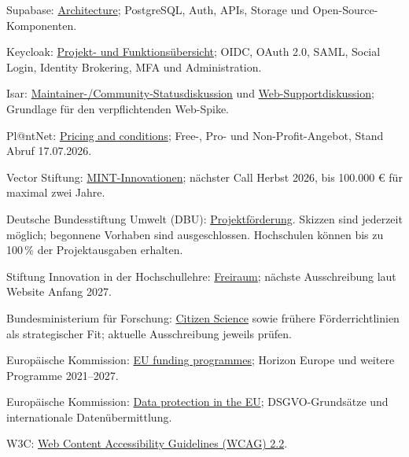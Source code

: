 \documentclass[10pt,a4paper,oneside]{article}
\begin{document}
\begin{enumerate}[leftmargin=9mm,label={\textcolor{Forest}{[\arabic*]}}]
  \hypertarget{src:8}{}\item Supabase: \href{https://supabase.com/docs/guides/getting-started/architecture}{Architecture}; PostgreSQL, Auth, APIs, Storage und Open-Source-Komponenten.
  \hypertarget{src:9}{}\item Keycloak: \href{https://www.keycloak.org/}{Projekt- und Funktionsübersicht}; OIDC, OAuth 2.0, SAML, Social Login, Identity Brokering, MFA und Administration.
  \hypertarget{src:10}{}\item Isar: \href{https://github.com/isar/isar/issues/1689}{Maintainer-/Community-Statusdiskussion} und \href{https://github.com/isar/isar/discussions/1143}{Web-Supportdiskussion}; Grundlage für den verpflichtenden Web-Spike.
  \hypertarget{src:11}{}\item Pl@ntNet: \href{https://my.plantnet.org/pricing}{Pricing and conditions}; Free-, Pro- und Non-Profit-Angebot, Stand Abruf 17.07.2026.
  \hypertarget{src:12}{}\item Vector Stiftung: \href{https://vector-stiftung.de/ausschreibungen/mint-innovationen/}{MINT-Innovationen}; nächster Call Herbst 2026, bis 100.000 € für maximal zwei Jahre.
  \hypertarget{src:13}{}\item Deutsche Bundesstiftung Umwelt (DBU): \href{https://www.dbu.de/foerderung/projektfoerderung/}{Projektförderung}. Skizzen sind jederzeit möglich; begonnene Vorhaben sind ausgeschlossen. Hochschulen können bis zu 100\,\% der Projektausgaben erhalten.
  \hypertarget{src:14}{}\item Stiftung Innovation in der Hochschullehre: \href{https://stiftung-hochschullehre.de/foerderung/freiraum/}{Freiraum}; nächste Ausschreibung laut Website Anfang 2027.
  \hypertarget{src:15}{}\item Bundesministerium für Forschung: \href{https://www.bmbf.de/DE/Forschung/Gesellschaft/Beteiligungdergesellschaft/CitizenScience/citizenscience.html}{Citizen Science} sowie frühere Förderrichtlinien als strategischer Fit; aktuelle Ausschreibung jeweils prüfen.
  \hypertarget{src:16}{}\item Europäische Kommission: \href{https://commission.europa.eu/funding-tenders/find-funding/eu-funding-programmes_en}{EU funding programmes}; Horizon Europe und weitere Programme 2021--2027.
  \hypertarget{src:17}{}\item Europäische Kommission: \href{https://commission.europa.eu/law/law-topic/data-protection_en}{Data protection in the EU}; DSGVO-Grundsätze und internationale Datenübermittlung.
\hypertarget{src:18}{}\item W3C: \href{https://www.w3.org/TR/WCAG22/}{Web Content Accessibility Guidelines (WCAG) 2.2}.
\end{enumerate}
\normalsize
\end{document}
